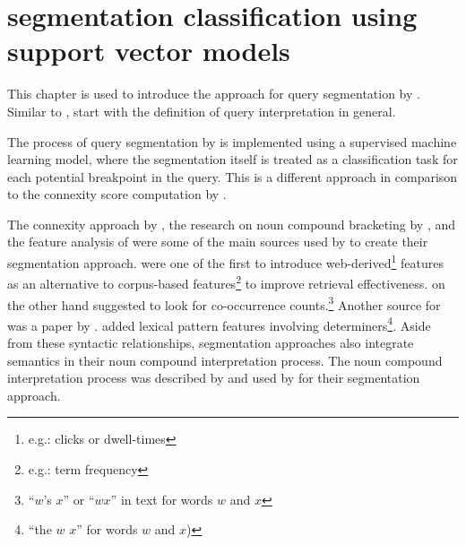 \section{segmentation classification using support vector models} \label{approach2}

This chapter is used to introduce the approach for query segmentation by \citeauthor{Bergsma:2007}. Similar to \citeauthor{Risvik:2003}, \citeauthor{Bergsma:2007} start with the definition of query interpretation in general. 

The process of query segmentation by \citeauthor{Bergsma:2007} is implemented using a supervised machine learning model, where the segmentation itself is treated as a classification task for each potential breakpoint in the query. This is a different approach in comparison to the connexity score computation by \citeauthor{Risvik:2003}.

The connexity approach by \citet{Risvik:2003}, the research on noun compound bracketing by \citet{Nakov:2005}, and the feature analysis of \citet{Keller:2003} were some of the main sources used by \citeauthor{Bergsma:2007} to create their segmentation approach. \citeauthor{Keller:2003} were one of the first to introduce web-derived\footnote{e.g.: clicks or dwell-times} features as an alternative to corpus-based features\footnote{e.g.: term frequency} to improve retrieval effectiveness. \citeauthor{Nakov:2005} on the other hand suggested to look for co-occurrence counts.\footnote{``$w$'s $x$'' or ``$wx$'' in text for words $w$ and $x$}
Another source for \citeauthor{Bergsma:2007} was a paper by \citet{Nicholson:2005}. \citeauthor{Nicholson:2005} added lexical pattern features involving determiners\footnote{``the $w$ $x$'' for words $w$ and $x$)}. Aside from these syntactic relationships, segmentation approaches also integrate semantics in their noun compound interpretation process. The noun compound interpretation process was described by \citet{Girju:2005} and used by \citeauthor{Bergsma:2007} for their segmentation approach.\\

